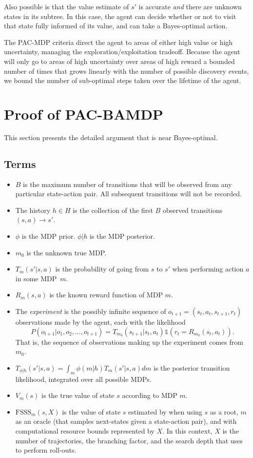 \begin{proofsketch}
Also possible is that the value estimate of $s'$ is accurate \emph{and} there are unknown states in its subtree. In this case, the agent can decide whether or not to visit that state fully informed of its value, and can take a Bayes-optimal action.

The PAC-MDP criteria direct the agent to areas of either high value or high uncertainty, managing the exploration/exploitation tradeoff. Because the agent will only go to areas of high uncertainty over areas of high reward a bounded number of times that grows linearly with the number of possible discovery events, we bound the number of sub-optimal steps taken over the lifetime of the agent.
\end{proofsketch}


\section{Proof of PAC-BAMDP}

This section presents the detailed argument that  is near
Bayes-optimal.


\subsection{Terms}
\begin{itemize}
\item $B$ is the maximum number of transitions that will be observed from any particular state-action pair. All subsequent transitions will not be recorded.
\item The history $h\in H$ is the collection of the first $B$ observed transitions $(s,a)\rightarrow s'$.
\item $\phi$ is the MDP prior. $\phi|h$ is the MDP posterior.
\item $m_0$ is the unknown true MDP.
\item $T_m(s'|s,a)$ is the probability of going from $s$ to $s'$ when performing action $a$ in some MDP~$m$.
\item $R_m(s,a)$ is the known reward function of MDP $m$.
\item The \emph{experiment} is the possibly infinite sequence of $o_{t+1} = (s_t,a_t,s_{t+1},r_t)$ observations made by the agent, each with the likelihood
$$P(o_{t+1}|o_1,o_2,...,o_{t+1}) = T_{m_0}(s_{t+1}|s_t,a_t)\mathbb{1}(r_t = R_{m_0}(s_t,a_t)).$$
That is, the sequence of observations making up the experiment comes from $m_0$.
\item $T_{\phi|h}(s'|s,a)=\int_m \phi(m|h)T_m(s'|s,a) dm$ is the posterior transition likelihood, integrated over all possible MDPs.
\item $V_m(s)$ is the true value of state $s$ according to MDP $m$.
\item $\mbox{FSSS}_m(s, X)$ is the value of state $s$ estimated by  when using $s$ as a root, $m$ as an oracle (that samples next-states given a state-action pair), and with computational resource bounds represented by $X$. In this context, $X$ is the number of trajectories, the branching factor, and the search depth that  uses to perform roll-outs.
\end{itemize}

